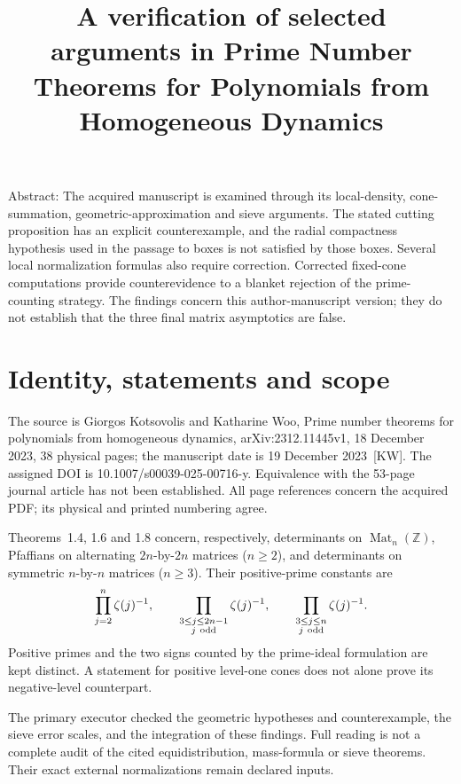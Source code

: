 \documentclass[10pt]{article}
\title{A verification of selected arguments in
Prime Number Theorems for Polynomials from Homogeneous Dynamics}
\author{}
\date{}
\begin{document}
\maketitle
Abstract: The acquired manuscript is examined through its local-density, cone-summation, geometric-approximation and sieve arguments. The stated cutting proposition has an explicit counterexample, and the radial compactness hypothesis used in the passage to boxes is not satisfied by those boxes. Several local normalization formulas also require correction. Corrected fixed-cone computations provide counterevidence to a blanket rejection of the prime-counting strategy. The findings concern this author-manuscript version; they do not establish that the three final matrix asymptotics are false.\par
\section*{Identity, statements and scope}
The source is Giorgos Kotsovolis and Katharine Woo, Prime number theorems for polynomials from homogeneous dynamics, arXiv:2312.11445v1, 18 December 2023, 38 physical pages; the manuscript date is 19 December 2023 [KW]. The assigned DOI is 10.1007/s00039-025-00716-y. Equivalence with the 53-page journal article has not been established. All page references concern the acquired PDF; its physical and printed numbering agree.\par
Theorems 1.4, 1.6 and 1.8 concern, respectively, determinants on \(\operatorname{Mat}_n(\mathbb Z)\), Pfaffians on alternating \(2n\)-by-\(2n\) matrices (\(n\ge2\)), and determinants on symmetric \(n\)-by-\(n\) matrices (\(n\ge3\)). Their positive-prime constants are \[\prod_{j=2}^n\zeta(j)^{-1},\qquad
 \prod_{\substack{3\le j\le2n-1\\j\ {\rm odd}}}\zeta(j)^{-1},\qquad
 \prod_{\substack{3\le j\le n\\j\ {\rm odd}}}\zeta(j)^{-1}.\] Positive primes and the two signs counted by the prime-ideal formulation are kept distinct. A statement for positive level-one cones does not alone prove its negative-level counterpart.\par
The primary executor checked the geometric hypotheses and counterexample, the sieve error scales, and the integration of these findings. Full reading is not a complete audit of the cited equidistribution, mass-formula or sieve theorems. Their exact external normalizations remain declared inputs.\par
\end{document}
